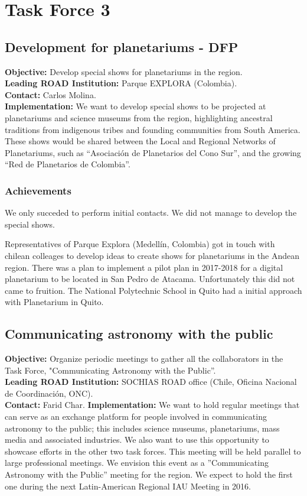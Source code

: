 \newpage
\section{Task Force 3}
\label{chapter 4}


\subsection{Development for planetariums - DFP}
\textbf{Objective:} Develop special shows for planetariums in the region.
\\
\textbf{Leading ROAD Institution:} Parque EXPLORA (Colombia).
\\
\textbf{Contact:} Carlos Molina.
\\
\textbf{Implementation:} We want to develop special shows to be projected at planetariums and science museums from the region, highlighting ancestral traditions from indigenous tribes and founding communities from South America.
These shows would be shared between the Local and Regional Networks of Planetariums, such as “Asociación de Planetarios
del Cono Sur”, and the growing “Red de Planetarios de Colombia”.

\subsubsection{Achievements}

We only succeded to perform initial contacts.
We did not manage to develop the special shows.


Representatives of Parque Explora (Medellín, Colombia) got in touch with chilean colleages to develop ideas to create shows for planetariums in the Andean region.
There was a plan to implement a pilot plan in 2017-2018 for a digital planetarium to be located in San Pedro de Atacama.
Unfortunately this did not came to fruition.
The National Polytechnic School in Quito had a initial approach with Planetarium in Quito.

\subsection{Communicating astronomy with the public}
\textbf{Objective:} Organize periodic meetings to gather all the collaborators in the Task Force, "Communicating Astronomy with the Public”.
\\
\textbf{Leading ROAD Institution:} SOCHIAS ROAD office (Chile, Oficina Nacional de Coordinación, ONC).
\\
\textbf{Contact:} Farid Char.
\textbf{Implementation:} We want to hold regular meetings that can serve as an exchange platform for people involved in communicating astronomy to the public; this includes science museums, planetariums, mass media and associated industries. We also want to use this opportunity to showcase efforts in the other two task forces. This meeting will be
held parallel to large professional meetings. We envision this event as a ”Communicating Astronomy with the Public” meeting for the region. We expect to hold the first one during the next Latin-American Regional IAU Meeting in 2016.


